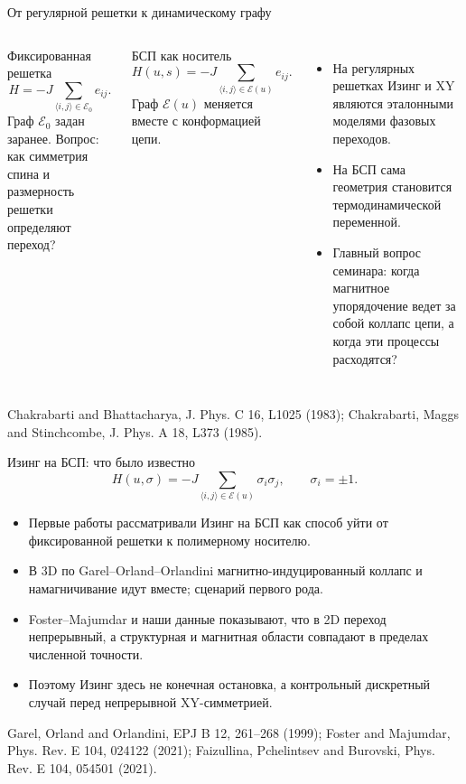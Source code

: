 \documentclass[t,aspectratio=169]{beamer}
\newcommand{\E}{\mathcal E}
\newcommand{\source}[1]{\vfill{\tiny\raggedright #1\par}}
\begin{document}
\begin{frame}{От регулярной решетки к динамическому графу}
  \small
  \begin{columns}[T,onlytextwidth]
    \begin{block}{Фиксированная решетка}
      \[
        H=-J\sum_{\langle i,j\rangle\in\E_0}e_{ij}.
      \]
      Граф \(\E_0\) задан заранее. Вопрос: как симметрия спина и размерность решетки определяют переход?
    \end{block}
    \begin{block}{БСП как носитель}
      \[
        H(u,s)=-J\sum_{\langle i,j\rangle\in\E(u)}e_{ij}.
      \]
      Граф \(\E(u)\) меняется вместе с конформацией цепи.
    \end{block}
    \begin{itemize}
      \item На регулярных решетках Изинг и XY являются эталонными моделями фазовых переходов.
      \item На БСП сама геометрия становится термодинамической переменной.
      \item Главный вопрос семинара: когда магнитное упорядочение ведет за собой коллапс цепи, а когда эти процессы расходятся?
    \end{itemize}
  \end{columns}
  \source{Chakrabarti and Bhattacharya, J. Phys. C 16, L1025 (1983); Chakrabarti, Maggs and Stinchcombe, J. Phys. A 18, L373 (1985).}
\end{frame}

\begin{frame}{Изинг на БСП: что было известно}
  \small
  \[
    H(u,\sigma)=-J\sum_{\langle i,j\rangle\in\E(u)}\sigma_i\sigma_j,
    \qquad \sigma_i=\pm1.
  \]
  \begin{itemize}
    \item Первые работы рассматривали Изинг на БСП как способ уйти от фиксированной решетки к полимерному носителю.
    \item В 3D по Garel--Orland--Orlandini магнитно-индуцированный коллапс и намагничивание идут вместе; сценарий первого рода.
    \item Foster--Majumdar и наши данные показывают, что в 2D переход непрерывный, а структурная и магнитная области совпадают в пределах численной точности.
    \item Поэтому Изинг здесь не конечная остановка, а контрольный дискретный случай перед непрерывной XY-симметрией.
  \end{itemize}
  \vspace{0.4em}
  \source{Garel, Orland and Orlandini, EPJ B 12, 261--268 (1999); Foster and Majumdar, Phys. Rev. E 104, 024122 (2021); Faizullina, Pchelintsev and Burovski, Phys. Rev. E 104, 054501 (2021).}
\end{frame}
\end{document}
